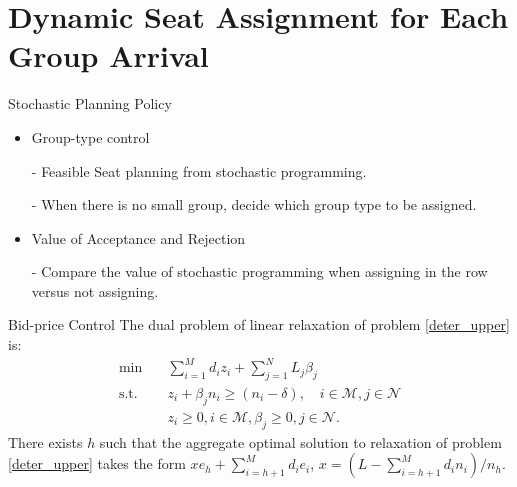 
\section{Dynamic Seat Assignment for Each Group Arrival}
    \frame{\sectionpage}
    \begin{frame}{Stochastic Planning Policy}
      \begin{itemize}
        \item Group-type control
        \item[-] Feasible Seat planning from stochastic programming.
        \item[-] When there is no small group, decide which group type to be assigned.
        \vspace*{1cm}
        \item Value of Acceptance and Rejection
        \item[-] Compare the value of stochastic programming when assigning in the row versus not assigning.
      \end{itemize}
    \end{frame}

      \begin{frame}{Bid-price Control}
        The dual problem of linear relaxation of problem \eqref{deter_upper} is:
        \begin{equation}\label{bid-price_dual}
          \begin{aligned}
          \min \quad & \sum_{i=1}^{M} d_i z_i + \sum_{j= 1}^{N} L_j \beta_{j} \\
          \text {s.t.} \quad & z_{i} + \beta_j n_i \geq (n_i-\delta), \quad i \in \mathcal{M}, j \in \mathcal{N} \\
          & z_{i} \geq 0, i \in \mathcal{M}, \beta_{j} \geq 0, j \in \mathcal{N}.
          \end{aligned}
        \end{equation}
        \small There exists $h$ such that the aggregate optimal solution to relaxation of problem \eqref{deter_upper} takes the form $x e_{h} + \sum_{i=h+1} ^{M} d_{i} e_{i}$, $x = (L- \sum_{i = h+1}^{M} {d_i n_i})/ n_h$.

      \end{frame}

